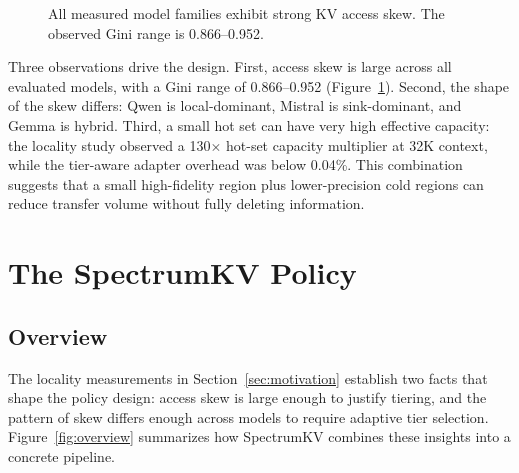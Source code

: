 \documentclass[11pt]{article}
\newcommand{\method}{SpectrumKV}
\newcommand{\pct}{\%}
\theoremstyle{plain}
\theoremstyle{definition}
\begin{document}
\begin{figure}[t]
\centering
{}
\caption{All measured model families exhibit strong KV access skew.  The observed Gini range is 0.866--0.952.}
\label{fig:gini}
\end{figure}

Three observations drive the design.  First, access skew is large across all evaluated models, with a Gini range of 0.866--0.952 (Figure~\ref{fig:gini}).  Second, the shape of the skew differs: Qwen is local-dominant, Mistral is sink-dominant, and Gemma is hybrid.  Third, a small hot set can have very high effective capacity: the locality study observed a 130$\times$ hot-set capacity multiplier at 32K context, while the tier-aware adapter overhead was below 0.04\pct{}.  This combination suggests that a small high-fidelity region plus lower-precision cold regions can reduce transfer volume without fully deleting information.

\section{The \method{} Policy}
\label{sec:method}

\subsection{Overview}

The locality measurements in Section~\ref{sec:motivation} establish two facts that shape the policy design: access skew is large enough to justify tiering, and the pattern of skew differs enough across models to require adaptive tier selection.  Figure~\ref{fig:overview} summarizes how \method{} combines these insights into a concrete pipeline.
\end{document}
